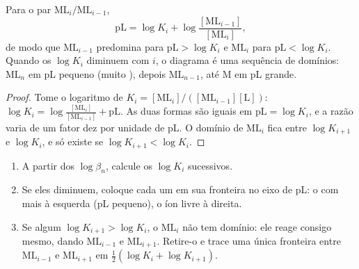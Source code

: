 \begin{proposition}[Fronteiras em pL]\label{prop:b1:complexation:pl-boundaries}
Para o par $\mathrm{ML}_i/\mathrm{ML}_{i-1}$,
\[
  \mathrm{pL} = \log K_i + \log\frac{[\mathrm{ML}_{i-1}]}{[\mathrm{ML}_i]} ,
\]
de modo que $\mathrm{ML}_{i-1}$ predomina para $\mathrm{pL} > \log K_i$ e
$\mathrm{ML}_i$ para $\mathrm{pL} < \log K_i$. Quando os $\log K_i$
diminuem com $i$, o diagrama é uma sequência de domínios: $\mathrm{ML}_n$
em pL pequeno (muito ), depois $\mathrm{ML}_{n-1}$, até M em pL
grande.
\end{proposition}

\begin{proof}
Tome o logaritmo de $K_i = [\mathrm{ML}_i]/([\mathrm{ML}_{i-1}][\mathrm{L}])$:
$\log K_i = \log\frac{[\mathrm{ML}_i]}{[\mathrm{ML}_{i-1}]} + \mathrm{pL}$.
As duas formas são iguais em $\mathrm{pL} = \log K_i$, e a razão varia
de um fator dez por unidade de pL. O domínio de $\mathrm{ML}_i$ fica
entre $\log K_{i+1}$ e $\log K_i$, e só existe se $\log K_{i+1} < \log
K_i$.
\end{proof}

\begin{method}\label{met:b1:complexation:pl-diagram}
\begin{enumerate}
  \item A partir dos $\log\beta_n$, calcule os $\log K_i$ sucessivos.
  \item Se eles diminuem, coloque cada um em sua fronteira no eixo de pL:
        o  com mais  à esquerda (pL pequeno), o íon livre
        à direita.
  \item Se algum $\log K_{i+1} > \log K_i$, o  $\mathrm{ML}_i$ não
        tem domínio: ele reage consigo mesmo, dando $\mathrm{ML}_{i-1}$ e
        $\mathrm{ML}_{i+1}$. Retire-o e trace uma única fronteira entre
        $\mathrm{ML}_{i-1}$ e $\mathrm{ML}_{i+1}$ em
        $\frac12(\log K_i + \log K_{i+1})$.
\end{enumerate}
\end{method}

